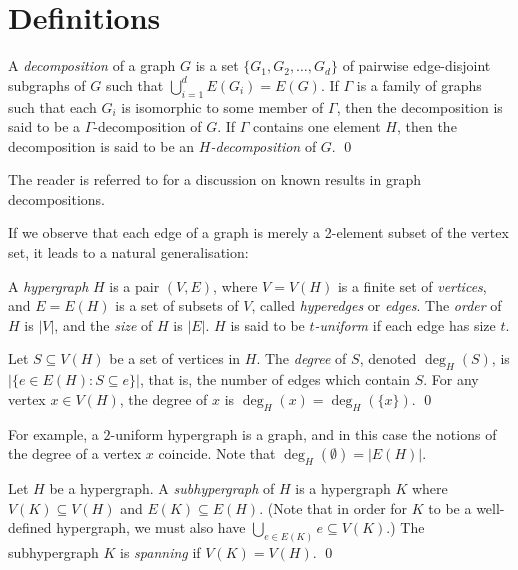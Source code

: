 \section{Definitions}


\begin{definition}
A {\em decomposition} of a graph $G$ is a set $\{G_1, G_2, \ldots, G_d\}$ of
pairwise edge-disjoint subgraphs of $G$ such that $\bigcup_{i=1}^d E(G_i) = E(G)$.
If $\Gamma$ is a family of graphs such that each $G_i$ is isomorphic to some
member of $\Gamma$, then the decomposition is said to be a $\Gamma$-decomposition of $G$.
If $\Gamma$ contains one element $H$, then the decomposition is said to be an
{\em $H$-decomposition} of $G$.
\qed
\end{definition}

The reader is referred to \cite{bryant-graph} for a discussion on known results
in graph decompositions.

If we observe that each edge of a graph is merely a 2-element subset of the
vertex set, it leads to a natural generalisation:

\begin{definition}
A {\em hypergraph} $H$ is a pair $(V, E)$, where $V = V(H)$ is a finite set of
{\em vertices}, and $E = E(H)$ is a set of subsets of $V$, called {\em
hyperedges} or {\em edges}.
The {\em order} of $H$ is $|V|$, and the {\em size} of $H$ is $|E|$.
$H$ is said to be {\em $t$-uniform} if each edge has size $t$.

Let $S \subseteq V(H)$ be a set of vertices in $H$. The {\em degree} of $S$,
denoted $\deg_H(S)$, is $|\{e \in E(H) : S \subseteq e\}|$, that is, the number
of edges which contain $S$.
For any vertex $x \in V(H)$, the degree of $x$ is $\deg_H(x) = \deg_H(\{x\})$.
\qed
\end{definition}

For example, a $2$-uniform hypergraph is a graph, and in this case the notions
of the degree of a vertex $x$ coincide. Note that $\deg_H(\emptyset) = |E(H)|$.

\begin{definition}
Let $H$ be a hypergraph. A {\em subhypergraph} of $H$ is a hypergraph $K$ where
$V(K) \subseteq V(H)$ and $E(K) \subseteq E(H)$. (Note that in order for $K$
to be a well-defined hypergraph, we must also have $\bigcup_{e \in E(K)} e
\subseteq V(K)$.) The subhypergraph $K$ is {\em spanning} if $V(K) = V(H)$.
\qed
\end{definition}

